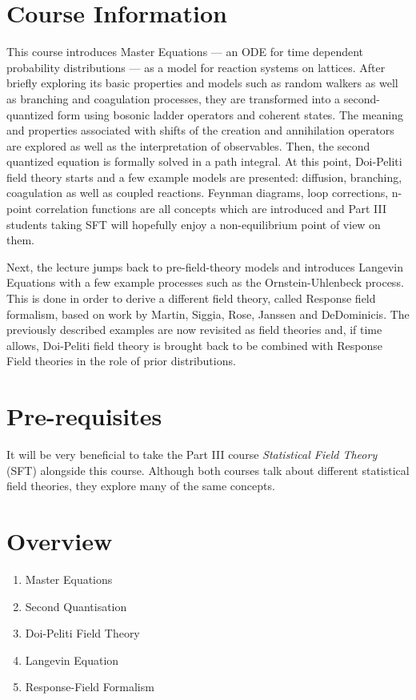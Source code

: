 \documentclass[a4paper,11pt]{article}
\begin{document}
	\maketitlepage
	\preliminaries

	\section*{Course Information}
	
	\noindent This course introduces Master Equations --- an ODE for time dependent probability distributions --- as a model for reaction systems on lattices. After briefly exploring its basic properties and models such as random walkers as well as branching and coagulation processes, they are transformed into a second-quantized form using bosonic ladder operators and coherent states. The meaning and properties associated with shifts of the creation and annihilation operators are explored as well as the interpretation of observables. Then, the second quantized equation is formally solved in a path integral. At this point, Doi-Peliti field theory starts and a few example models are presented: diffusion, branching, coagulation as well as coupled reactions. Feynman diagrams, loop corrections, n-point correlation functions are all concepts which are introduced and Part III students taking SFT will hopefully enjoy a non-equilibrium point of view on them.

	\noindent Next, the lecture jumps back to pre-field-theory models and introduces Langevin Equations with a few example processes such as the Ornstein-Uhlenbeck process. This is done in order to derive a different field theory, called Response field formalism, based on work by Martin, Siggia, Rose, Janssen and DeDominicis. The previously described examples are now revisited as field theories and, if time allows, Doi-Peliti field theory is brought back to be combined with Response Field theories in the role of prior distributions.

	\section*{Pre-requisites}

	It will be very beneficial to take the Part III course \emph{Statistical Field Theory} (SFT) alongside this course. Although both courses talk about different statistical field theories, they explore many of the same concepts.

	\newpage
	\section*{Overview}
	\begin{enumerate}
		\item Master Equations
		\item Second Quantisation
		\item Doi-Peliti Field Theory
		\item Langevin Equation
		\item Response-Field Formalism
	\end{enumerate}
\end{document}
